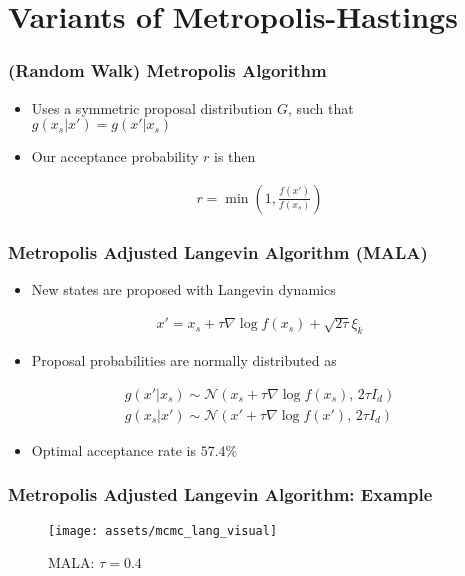 \documentclass{beamer}
\begin{document}

\section{Variants of Metropolis-Hastings}
\begin{frame}
  \frametitle{(Random Walk) Metropolis Algorithm}
  \begin{itemize}
    \item Uses a symmetric proposal distribution $G$, such that \\
    $g(x_s|x') = g(x'|x_s)$
    \item Our acceptance probability $r$ is then
  \end{itemize}
  \begin{gather*}
    r = \min \left(1 , \frac{f(x')}{f(x_s)} \right)
  \end{gather*}
\end{frame}

\begin{frame}
  \frametitle{Metropolis Adjusted Langevin Algorithm (MALA)}
  \begin{itemize}
    \item New states are proposed with Langevin dynamics
  \end{itemize}
  \begin{gather*}
      x' = x_s + \tau \nabla \log f(x_s) + \sqrt{2 \tau} \xi_k
  \end{gather*}
  \begin{itemize}
    \item Proposal probabilities are normally distributed as
  \end{itemize}
  \begin{gather*}
    g(x'| x_s) \sim \mathcal{N}(x_s + \tau \nabla \log f(x_s), \, 2 \tau  I_d) \\
    g(x_s | x') \sim \mathcal{N}(x' + \tau \nabla \log f(x'), \, 2 \tau  I_d)
  \end{gather*}
  \begin{itemize}
    \item Optimal acceptance rate is $57.4\%$
  \end{itemize}
\end{frame}

\begin{frame}
  \frametitle{Metropolis Adjusted Langevin Algorithm: Example}
  \begin{figure}
    \centering
    \texttt{[image: assets/mcmc\_lang\_visual]}
    \caption{MALA: $\tau=0.4$}
  \end{figure}
\end{frame}
\end{document}
